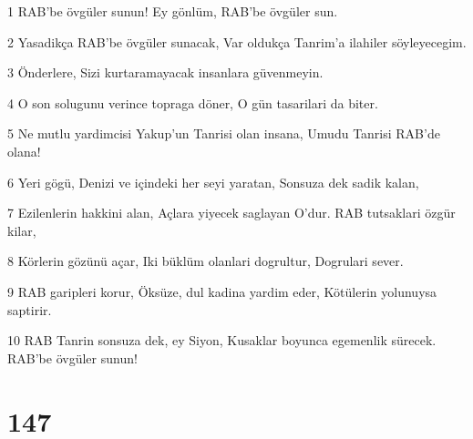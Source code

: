 \par 1 RAB'be övgüler sunun! Ey gönlüm, RAB'be övgüler sun.
\par 2 Yasadikça RAB'be övgüler sunacak, Var oldukça Tanrim'a ilahiler söyleyecegim.
\par 3 Önderlere, Sizi kurtaramayacak insanlara güvenmeyin.
\par 4 O son solugunu verince topraga döner, O gün tasarilari da biter.
\par 5 Ne mutlu yardimcisi Yakup'un Tanrisi olan insana, Umudu Tanrisi RAB'de olana!
\par 6 Yeri gögü, Denizi ve içindeki her seyi yaratan, Sonsuza dek sadik kalan,
\par 7 Ezilenlerin hakkini alan, Açlara yiyecek saglayan O'dur. RAB tutsaklari özgür kilar,
\par 8 Körlerin gözünü açar, Iki büklüm olanlari dogrultur, Dogrulari sever.
\par 9 RAB garipleri korur, Öksüze, dul kadina yardim eder, Kötülerin yolunuysa saptirir.
\par 10 RAB Tanrin sonsuza dek, ey Siyon, Kusaklar boyunca egemenlik sürecek. RAB'be övgüler sunun!

\chapter{147}

